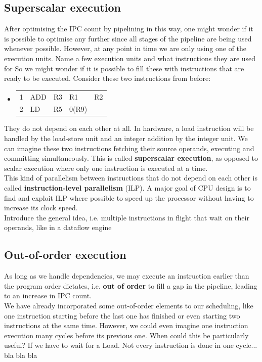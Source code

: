 \documentclass[12pt,a4paper]{article}
\newenvironment {assembly}{\begingroup \ttfamily \color{Orange} \begin{itemize} \item[]}{\end{itemize}\endgroup}
\newcommand{\note}{\textcolor{WildStrawberry}}
\begin{document}
\subsection{Superscalar execution}
After optimising the IPC count by pipelining in this way, one might wonder if it is possible to optimise any further since all stages of the pipeline are being used whenever possible. However, at any point in time we are only using one of the execution units. \note{Name a few execution units and what instructions they are used for} So we might wonder if it is possible to fill these with instructions that are ready to be executed. Consider these two instructions from before:
\begin{assembly}
	\begin{tabularx} {\textwidth} {l l a a X}
		1 & ADD & R3 & R1		& R2 \\
		2 & LD  & R5 & 0(R9)	& \\
	\end{tabularx}
\end{assembly}
They do not depend on each other at all. In hardware, a load instruction will be handled by the load-store unit and an integer addition by the integer unit. We can imagine these two instructions fetching their source operands, executing and committing simultaneously. This is called \textbf{superscalar execution}, as opposed to  scalar execution where only one instruction is executed at a time.\\
This kind of parallelism between instructions that do not depend on each other is called \textbf{instruction-level parallelism} (ILP). A major goal of CPU design is to find and exploit ILP where possible to speed up the processor without having to increase its clock speed.\\



\note{Introduce the general idea, i.e. multiple instructions in flight that wait on their operands, like in a dataflow engine}\\

\subsection{Out-of-order execution}
As long as we handle dependencies, we may execute an instruction earlier than the program order dictates, i.e. \textbf{out of order} to fill a gap in the pipeline, leading to an increase in IPC count. \\


\note{We have already incorporated some out-of-order elements to our scheduling, like one instruction starting before the last one has finished or even starting two instructions at the same time. However, we could even imagine one instruction execution many cycles before its previous one. When could this be particularly useful? If we have to wait for a Load. Not every instruction is done in one cycle... bla bla bla}\\
\end{document}
